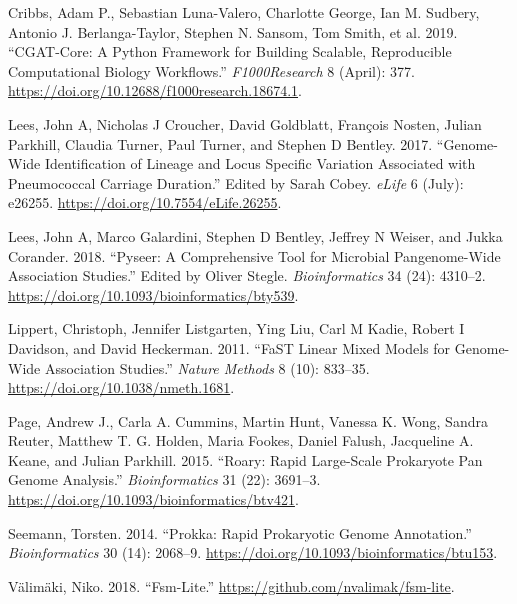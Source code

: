 \documentclass[]{article}
\begin{document}
\printacronyms[include-classes=abbrev]

\hypertarget{refs}{}
\leavevmode\hypertarget{ref-cribbs_cgat-core:_2019}{}%
Cribbs, Adam P., Sebastian Luna-Valero, Charlotte George, Ian M.
Sudbery, Antonio J. Berlanga-Taylor, Stephen N. Sansom, Tom Smith, et
al. 2019. ``CGAT-Core: A Python Framework for Building Scalable,
Reproducible Computational Biology Workflows.'' \emph{F1000Research} 8
(April): 377. \url{https://doi.org/10.12688/f1000research.18674.1}.

\leavevmode\hypertarget{ref-lees_genome-wide_2017}{}%
Lees, John A, Nicholas J Croucher, David Goldblatt, François Nosten,
Julian Parkhill, Claudia Turner, Paul Turner, and Stephen D Bentley.
2017. ``Genome-Wide Identification of Lineage and Locus Specific
Variation Associated with Pneumococcal Carriage Duration.'' Edited by
Sarah Cobey. \emph{eLife} 6 (July): e26255.
\url{https://doi.org/10.7554/eLife.26255}.

\leavevmode\hypertarget{ref-lees_pyseer:_2018}{}%
Lees, John A, Marco Galardini, Stephen D Bentley, Jeffrey N Weiser, and
Jukka Corander. 2018. ``Pyseer: A Comprehensive Tool for Microbial
Pangenome-Wide Association Studies.'' Edited by Oliver Stegle.
\emph{Bioinformatics} 34 (24): 4310--2.
\url{https://doi.org/10.1093/bioinformatics/bty539}.

\leavevmode\hypertarget{ref-lippert_fast_2011}{}%
Lippert, Christoph, Jennifer Listgarten, Ying Liu, Carl M Kadie, Robert
I Davidson, and David Heckerman. 2011. ``FaST Linear Mixed Models for
Genome-Wide Association Studies.'' \emph{Nature Methods} 8 (10):
833--35. \url{https://doi.org/10.1038/nmeth.1681}.

\leavevmode\hypertarget{ref-page_roary:_2015}{}%
Page, Andrew J., Carla A. Cummins, Martin Hunt, Vanessa K. Wong, Sandra
Reuter, Matthew T. G. Holden, Maria Fookes, Daniel Falush, Jacqueline A.
Keane, and Julian Parkhill. 2015. ``Roary: Rapid Large-Scale Prokaryote
Pan Genome Analysis.'' \emph{Bioinformatics} 31 (22): 3691--3.
\url{https://doi.org/10.1093/bioinformatics/btv421}.

\leavevmode\hypertarget{ref-seemann_prokka:_2014}{}%
Seemann, Torsten. 2014. ``Prokka: Rapid Prokaryotic Genome Annotation.''
\emph{Bioinformatics} 30 (14): 2068--9.
\url{https://doi.org/10.1093/bioinformatics/btu153}.

\leavevmode\hypertarget{ref-valimaki_fsm-lite_2018}{}%
Välimäki, Niko. 2018. ``Fsm-Lite.''
\url{https://github.com/nvalimak/fsm-lite}.
\end{document}

